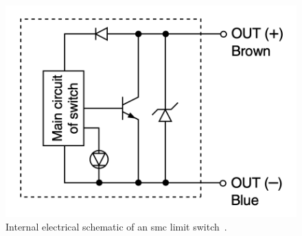         \begin{figure}[H]
            \centering
            \includegraphics[scale = 0.4]{2_images/autSwShm.png}
            \caption{Internal electrical schematic of an \acrshort{smc} limit switch~\cite{smcRot}.}
            \label{fig:autSwShm}
        \end{figure}
    
        
    
